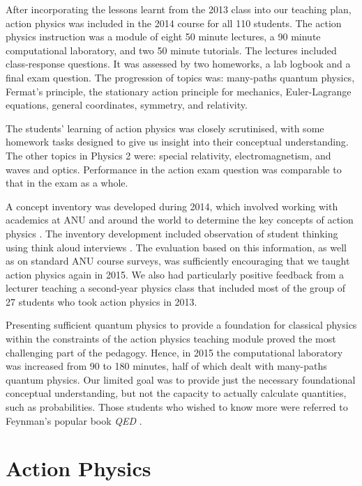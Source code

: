 \documentclass[prb,oncolumn,12pt]{revtex4-2}
\begin{document}
After incorporating the lessons learnt from the 2013 class into our teaching plan, action physics was included in the 2014 course for all 110 students. The action physics instruction was a module of eight 50 minute lectures, a 90 minute computational laboratory, and two 50 minute tutorials. The lectures included class-response questions.  It was assessed by two homeworks, a lab logbook and a final exam question. The progression of topics was: many-paths quantum physics, Fermat's principle, the stationary action principle for mechanics, Euler-Lagrange equations, general coordinates, symmetry, and relativity.

The students' learning of action physics was closely scrutinised, with some homework tasks designed to give us insight into their conceptual understanding.  The other topics in Physics 2 were: special relativity, electromagnetism, and waves and optics. Performance in the action exam question was comparable to that in the exam as a whole.

A concept inventory was developed during 2014, which involved working with academics at ANU and around the world to determine the key concepts of action physics  \cite{McGinness}. The inventory development included observation of student thinking using think aloud interviews  \cite{Adams}. The evaluation based on this information, as well as on standard ANU course surveys, was sufficiently encouraging that we taught action physics again in 2015. We also had  particularly positive feedback from a lecturer teaching a second-year physics class that included most of the group of 27 students who took action physics in 2013.

Presenting sufficient quantum physics to provide a foundation for classical physics within the constraints of the action physics teaching module proved the most challenging part of the pedagogy. Hence, in 2015 the computational laboratory was increased from 90 to 180 minutes, half of which dealt with many-paths quantum physics. Our limited goal was to provide just the necessary foundational conceptual understanding, but not the capacity to actually calculate quantities, such as probabilities. Those students who wished to know more were referred to Feynman's popular book \textit{QED}  \cite{QED}.


\section{Action Physics}
\label{Action Physics}
\end{document}
